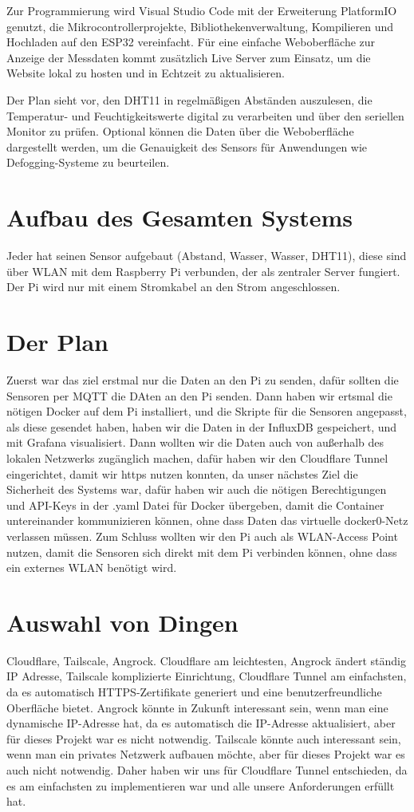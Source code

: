 Zur Programmierung wird Visual Studio Code mit der Erweiterung 
PlatformIO genutzt, die Mikrocontrollerprojekte, 
Bibliothekenverwaltung, Kompilieren und Hochladen auf den ESP32 
vereinfacht. Für eine einfache Weboberfläche zur Anzeige der 
Messdaten kommt zusätzlich Live Server zum Einsatz, um die 
Website lokal zu hosten und in Echtzeit zu aktualisieren.

Der Plan sieht vor, den DHT11 in regelmäßigen Abständen 
auszulesen, die Temperatur- und Feuchtigkeitswerte digital 
zu verarbeiten und über den seriellen Monitor zu prüfen. 
Optional können die Daten über die Weboberfläche dargestellt 
werden, um die Genauigkeit des Sensors für Anwendungen wie 
Defogging-Systeme zu beurteilen.

\section{Aufbau des Gesamten Systems}
Jeder hat seinen Sensor aufgebaut (Abstand, Wasser, Wasser, DHT11), diese sind über WLAN mit dem Raspberry Pi verbunden, der als zentraler Server fungiert. Der Pi wird nur mit einem Stromkabel an den Strom angeschlossen.

\section{Der Plan}
Zuerst war das ziel erstmal nur die Daten an den Pi zu senden, dafür sollten die Sensoren per MQTT die DAten an den Pi senden. Dann haben wir ertsmal die nötigen Docker auf dem Pi installiert, und die Skripte für die Sensoren angepasst, als diese gesendet haben, haben wir die Daten in der InfluxDB gespeichert, und mit Grafana visualisiert. Dann wollten wir die Daten auch von außerhalb des lokalen Netzwerks zugänglich machen, dafür haben wir den Cloudflare Tunnel eingerichtet, damit wir https nutzen konnten, da unser nächstes Ziel die Sicherheit des Systems war, dafür haben wir auch die nötigen Berechtigungen und API-Keys in der .yaml Datei für Docker übergeben, damit die Container untereinander kommunizieren können, ohne dass Daten das virtuelle docker0-Netz verlassen müssen. Zum Schluss wollten wir den Pi auch als WLAN-Access Point nutzen, damit die Sensoren sich direkt mit dem Pi verbinden können, ohne dass ein externes WLAN benötigt wird.

\section{Auswahl von Dingen}

Cloudflare, Tailscale, Angrock. Cloudflare am leichtesten, Angrock ändert ständig IP Adresse, Tailscale komplizierte Einrichtung, Cloudflare Tunnel am einfachsten, da es automatisch HTTPS-Zertifikate generiert und eine benutzerfreundliche Oberfläche bietet. Angrock könnte in Zukunft interessant sein, wenn man eine dynamische IP-Adresse hat, da es automatisch die IP-Adresse aktualisiert, aber für dieses Projekt war es nicht notwendig. Tailscale könnte auch interessant sein, wenn man ein privates Netzwerk aufbauen möchte, aber für dieses Projekt war es auch nicht notwendig. Daher haben wir uns für Cloudflare Tunnel entschieden, da es am einfachsten zu implementieren war und alle unsere Anforderungen erfüllt hat.
